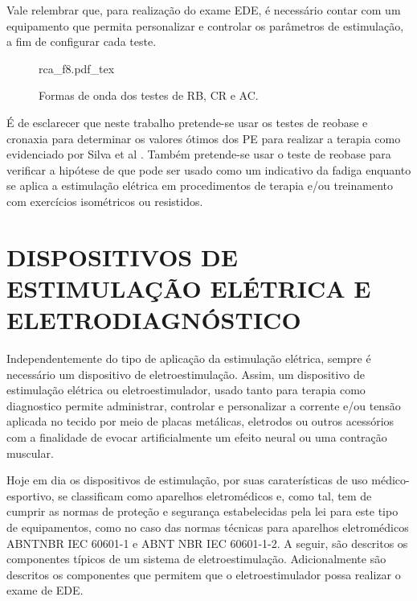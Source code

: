 Vale relembrar que, para realização do exame \acrshort{EDE}, é necessário contar com um equipamento que permita personalizar e controlar os parâmetros de estimulação, a fim de configurar cada teste.

\begin{figure*}[ht]
    \centering %
    \small %
    \def\svgwidth{1\columnwidth}%
    {rca_f8.pdf_tex}
    \caption{Formas de onda dos testes de \acrshort{RB}, \acrshort{CR} e \acrshort{AC}.}
    \label{fig:rca_f8}
\end{figure*}

É de esclarecer que neste trabalho pretende-se usar os testes de reobase e cronaxia para determinar os valores ótimos dos PE para realizar a terapia como evidenciado por Silva et al \cite{Silva2016SafetyStudy.}. Também pretende-se usar o teste de reobase para verificar a hipótese de que pode ser usado como um indicativo da fadiga enquanto se aplica a estimulação elétrica em procedimentos de terapia e/ou treinamento com exercícios isométricos ou resistidos.


\section{DISPOSITIVOS DE ESTIMULAÇÃO ELÉTRICA E ELETRODIAGNÓSTICO}
Independentemente do tipo de aplicação da estimulação elétrica, sempre é necessário um dispositivo de eletroestimulação. Assim, um dispositivo de estimulação elétrica ou eletroestimulador, usado tanto para terapia como diagnostico permite administrar, controlar e personalizar a corrente e/ou tensão aplicada no tecido por meio de placas metálicas, eletrodos ou outros acessórios com a finalidade de evocar artificialmente um efeito neural ou uma contração muscular.

Hoje em dia os dispositivos de estimulação, por suas caraterísticas de uso médico-esportivo, se classificam como aparelhos eletromédicos e, como tal, tem de cumprir as normas de proteção e segurança estabelecidas pela lei para este tipo de equipamentos, como no caso das normas técnicas para aparelhos eletromédicos \acrshort{ABNT}\acrshort{NBR} \acrshort{IEC} 60601-1 e \acrshort{ABNT} \acrshort{NBR} \acrshort{IEC} 60601-1-2.
A seguir, são descritos os componentes típicos de um sistema de eletroestimulação. Adicionalmente são descritos os componentes que permitem que o eletroestimulador possa realizar o exame de \acrshort{EDE}.


